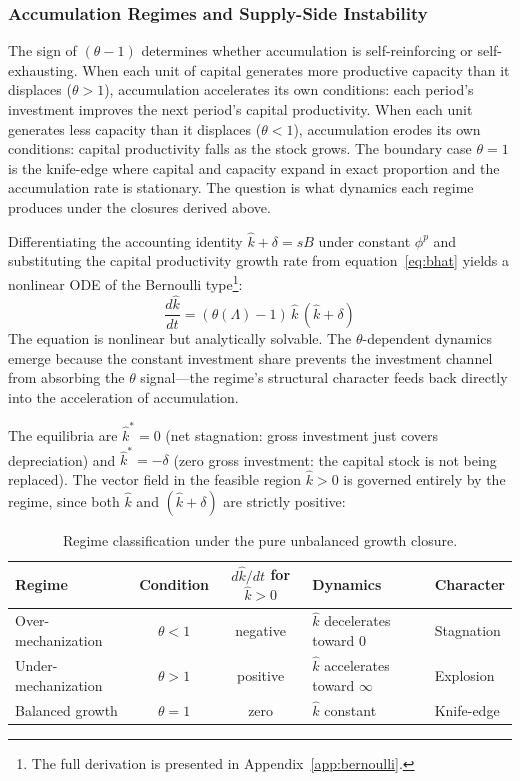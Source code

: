 
\subsubsection{Accumulation Regimes and Supply-Side Instability}
\label{sec:regimes}

The sign of $(\theta - 1)$ determines whether accumulation is self-reinforcing or self-exhausting. When each unit of capital generates more productive capacity than it displaces ($\theta > 1$), accumulation accelerates its own conditions: each period's investment improves the next period's capital productivity. When each unit generates less capacity than it displaces ($\theta < 1$), accumulation erodes its own conditions: capital productivity falls as the stock grows. The boundary case $\theta = 1$ is the knife-edge where capital and capacity expand in exact proportion and the accumulation rate is stationary. The question is what dynamics each regime produces under the closures derived above.

Differentiating the accounting identity $\hat{k} + \delta = sB$ under constant $\phi^p$ and substituting the capital productivity growth rate from equation~\eqref{eq:bhat} yields a nonlinear ODE of the Bernoulli type\footnote{The full derivation is presented in Appendix~\ref{app:bernoulli}.}:
%
\begin{equation}\label{eq:bernoulli}
	\boxed{\frac{d\hat{k}}{dt} = (\theta(\Lambda) - 1)\,\hat{k}\,(\hat{k} + \delta)}
\end{equation}
%
The equation is nonlinear but analytically solvable. The $\theta$-dependent dynamics emerge because the constant investment share prevents the investment channel from absorbing the $\theta$ signal---the regime's structural character feeds back directly into the acceleration of accumulation.

The equilibria are $\hat{k}^* = 0$ (net stagnation: gross investment just covers depreciation) and $\hat{k}^* = -\delta$ (zero gross investment: the capital stock is not being replaced). The vector field in the feasible region $\hat{k} > 0$ is governed entirely by the regime, since both $\hat{k}$ and $(\hat{k} + \delta)$ are strictly positive:

\begin{table}[H]
	\centering
	\begin{tabular}{lccll}
		\toprule
		\textbf{Regime} & \textbf{Condition} & $d\hat{k}/dt$ for $\hat{k} > 0$ & \textbf{Dynamics} & \textbf{Character} \\
		\midrule
		Over-mechanization & $\theta < 1$ & negative & $\hat{k}$ decelerates toward 0 & Stagnation \\
		Under-mechanization & $\theta > 1$ & positive & $\hat{k}$ accelerates toward $\infty$ & Explosion \\
		Balanced growth & $\theta = 1$ & zero & $\hat{k}$ constant & Knife-edge \\
		\bottomrule
	\end{tabular}
	\caption{Regime classification under the pure unbalanced growth closure.}
	\label{tab:regime_classification}
\end{table}

